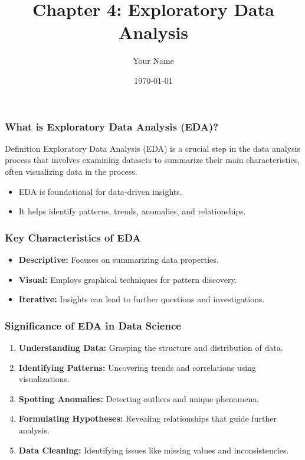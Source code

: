 \documentclass{beamer}
\title{Chapter 4: Exploratory Data Analysis}
\author{Your Name}
\institute{Your Institution}
\date{\today}
\begin{document}
\frame{\titlepage}

\begin{frame}
    \titlepage
\end{frame}

\begin{frame}[fragile]
    \frametitle{What is Exploratory Data Analysis (EDA)?}
    \begin{block}{Definition}
        Exploratory Data Analysis (EDA) is a crucial step in the data analysis process that involves examining datasets to summarize their main characteristics, often visualizing data in the process. 
    \end{block}
    \begin{itemize}
        \item EDA is foundational for data-driven insights.
        \item It helps identify patterns, trends, anomalies, and relationships.
    \end{itemize}
\end{frame}

\begin{frame}[fragile]
    \frametitle{Key Characteristics of EDA}
    \begin{itemize}
        \item \textbf{Descriptive:} Focuses on summarizing data properties.
        \item \textbf{Visual:} Employs graphical techniques for pattern discovery.
        \item \textbf{Iterative:} Insights can lead to further questions and investigations.
    \end{itemize}
\end{frame}

\begin{frame}[fragile]
    \frametitle{Significance of EDA in Data Science}
    \begin{enumerate}
        \item \textbf{Understanding Data:} Grasping the structure and distribution of data.
        \item \textbf{Identifying Patterns:} Uncovering trends and correlations using visualizations.
        \item \textbf{Spotting Anomalies:} Detecting outliers and unique phenomena.
        \item \textbf{Formulating Hypotheses:} Revealing relationships that guide further analysis.
        \item \textbf{Data Cleaning:} Identifying issues like missing values and inconsistencies.
    \end{enumerate}
\end{frame}
\end{document}
